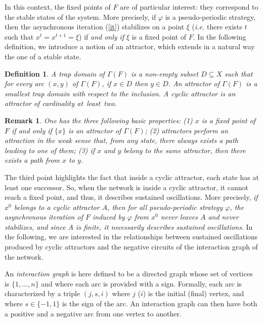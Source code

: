 \documentclass[11pt]{article}
\newtheorem{definition}{Definition}
\newtheorem{remark}{Remark}
\def\1n{1,\dots,n}
\def\phi{\varphi}
\begin{document}
In this context, the fixed points of $F$ are of particular interest:
they correspond to the stable states of the system. More precisely, if
$\phi$ is a pseudo-periodic strategy, then the asynchronous iteration
(\ref{it}) stabilizes on a point $\xi$ (\emph{i.e.} there exists $t$
such that $x^{t}=x^{t+1}=\xi$) if {\emph{and only if}} $\xi$ is a
fixed point of $F$. In the following definition, we introduce a notion
of an attractor, which extends in a natural way the one of a stable
state.

\begin{definition}
A {\emph{trap domain}} of $\Gamma(F)$ is a non-empty subset
$D\subseteq X$ such that for every arc $(x,y)$ of $\Gamma(F)$, if
$x\in D$ then $y\in D$. An {\emph{attractor}} of $\Gamma(F)$ is a
smallest trap domain with respect to the inclusion. A {\emph{cyclic
attractor}} is an attractor of cardinality at~least~two.
\end{definition}


\begin{remark} 
{\emph{One has the three following basic properties: (1) $x$ is a
fixed point of $F$ if and only if $\{x\}$ is an attractor of
$\Gamma(F)$; (2) attractors perform an attraction in the weak sense
that, from any state, there always exists a path leading to one of
them; (3) if $x$ and $y$ belong to the same attractor, then there
exists a path from $x$ to $y$.}}
\end{remark}
The third point highlights the fact that inside a cyclic attractor,
each state has at least one successor. So, when the network is inside
a cyclic attractor, it cannot reach a fixed point, and thus, it
describes sustained oscillations. More precisely, {\emph{if $x^0$
belongs to a cyclic attractor $A$, then for all pseudo-periodic
strategy $\phi$, the asynchronous iteration of $F$ induced by $\phi$
from $x^0$ never leaves $A$ and never stabilizes, and since $A$ is
finite, it necessarily describes sustained oscillations}}. In the
following, we are interested in the relationships between sustained
oscillations produced by cyclic attractors and the negative circuits
of the interaction graph of the network.

An {\it interaction graph} is here defined to be a directed graph
whose set of vertices is $\{\1n\}$ and where each arc is provided with
a sign. Formally, each arc is characterized by a triple $(j,s,i)$
where $j$ ($i$) is the initial (final) vertex, and where
$s\in\{-1,1\}$ is the sign of the arc. An interaction graph can then
have both a positive and a negative arc from one vertex to another.
\end{document}
